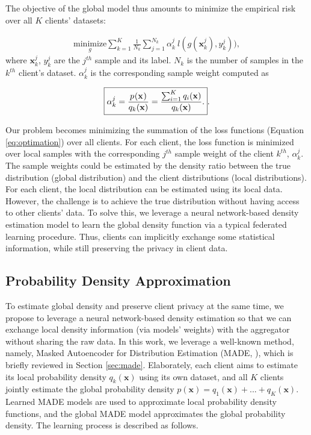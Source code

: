 The objective of the global model thus amounts to minimize the empirical risk over all $K$ clients' datasets:

\begin{equation}
\begin{aligned}
\underset{g}{\text{minimize}}
\sum_{k=1}^{K} \frac{1}{N_k}\sum_{j=1}^{N_k} \alpha_k^j \:l(g(\mathbf{x}_k^j),y_k^j)), \label{eq:optimation}
\end{aligned}
\end{equation} 
where $\mathbf{x}_k^j$, $y_k^j$ are the $j^{th}$ sample and its label. $N_k$ is the number of samples in the $k^{th}$ client's dataset. $\alpha_k^j$ is the corresponding sample weight computed as

\begin{equation}
\begin{aligned}
\boxed{\alpha_k^j = \frac{ p_{}(\mathbf{x_{}})}{q_k(\mathbf{x})}  = \frac{ \sum_{i=1}^{K}q_i(\mathbf{x}) }{q_k(\mathbf{x})}. }  
\label{eq:alpha}.
\end{aligned}
\end{equation}

Our problem becomes minimizing the summation of the loss functions (Equation \ref{eq:optimation}) over all clients. For each client, the loss function is minimized over local samples with the corresponding $j^{th}$ sample weight of the client $k^{th}$, $\alpha_k^j$. The sample weights could be estimated by the density ratio between the true distribution (global distribution) and the client distributions (local distributions). For each client, the local distribution can be estimated using its local data. However, the challenge is to achieve the true distribution without having access to other clients' data. To solve this, we leverage a neural network-based density estimation model to learn the global density function via a typical federated learning procedure. Thus, clients can implicitly exchange some statistical information, while still preserving the privacy in client data.          


\subsection{Probability Density Approximation}
\label{sec:densityapproximation}
To estimate global density and preserve client privacy at the same time, we propose to leverage a neural network-based density estimation so that we can exchange local density information (via models' weights) with the aggregator without sharing the raw data. In this work, we leverage a well-known method, namely, Masked Autoencoder for Distribution Estimation (MADE, \cite{MADE}), which is briefly reviewed in Section \ref{sec:made}. Elaborately, each client aims to estimate its local probability density $q_k(\mathbf{x})$ using its own dataset, and all $K$ clients jointly estimate the global probability density $p(\mathbf{x}) = q_1(\mathbf{x})+...+q_K(\mathbf{x})$. Learned MADE models are used to approximate local probability density functions, and the global MADE model approximates the global probability density. The learning process is described as follows.    

